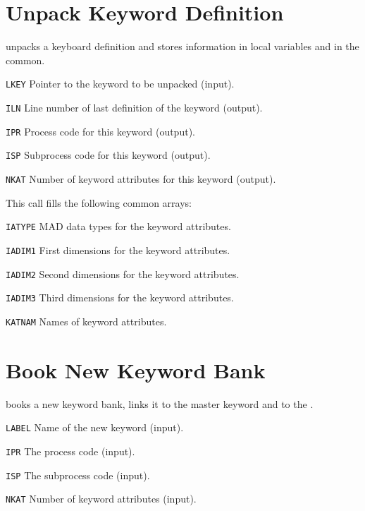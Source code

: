 \section{Unpack Keyword Definition}
\label{KWGET}
unpacks a keyboard definition and stores information in local variables
and in the  common.
\begin{mylist}
\item[\tt LKEY]
Pointer to the keyword to be unpacked (input).
\item[\tt ILN]
Line number of last definition of the keyword (output).
\item[\tt IPR]
Process code for this keyword (output).
\item[\tt ISP]
Subprocess code for this keyword (output).
\item[\tt NKAT]
Number of keyword attributes for this keyword (output).
\end{mylist}
This call fills the following common arrays:
\begin{mylist}
\item[\tt IATYPE]
MAD data types for the keyword attributes. 
\item[\tt IADIM1]
First dimensions for the keyword attributes.
\item[\tt IADIM2]
Second dimensions for the keyword attributes.
\item[\tt IADIM3]
Third dimensions for the keyword attributes.
\item[\tt KATNAM]
Names of keyword attributes.
\end{mylist}

\section{Book New Keyword Bank}
\label{KWMAKE}
books a new keyword bank, links it to the master keyword and to the
.
\begin{mylist}
\item[\tt LABEL]
Name of the new keyword (input).
\item[\tt IPR]
The process code (input).
\item[\tt ISP]
The subprocess code (input).
\item[\tt NKAT]
Number of keyword attributes (input).
\end{mylist}

